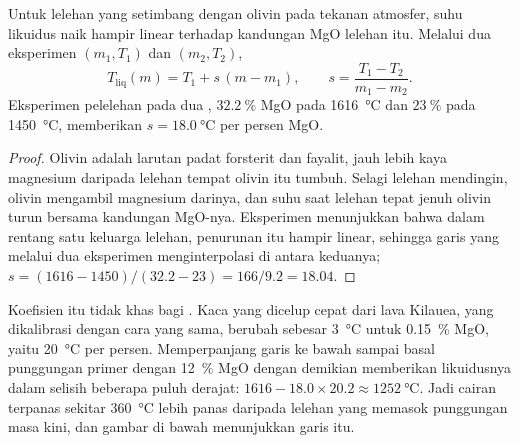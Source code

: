 \begin{proposition}\label{prop:b2:precambrian-earth:liquidus}
Untuk lelehan yang setimbang dengan olivin pada tekanan atmosfer, suhu likuidus naik
hampir linear terhadap kandungan MgO lelehan itu. Melalui dua eksperimen $(m_1, T_1)$ dan
$(m_2, T_2)$,
\[
  T_{\text{liq}}(m) = T_1 + s\,(m - m_1), \qquad s = \frac{T_1 - T_2}{m_1 - m_2} .
\]
Eksperimen pelelehan pada dua , $\qty{32.2}{\percent}$ MgO pada \qty{1616}{\celsius} dan
$\qty{23}{\percent}$ pada \qty{1450}{\celsius}, memberikan $s = \qty{18.0}{\celsius}$ per persen
MgO.
\end{proposition}

\begin{proof}
Olivin adalah larutan padat forsterit dan fayalit, jauh lebih kaya magnesium daripada lelehan
tempat olivin itu tumbuh. Selagi lelehan mendingin, olivin mengambil magnesium darinya, dan suhu
saat lelehan tepat jenuh olivin turun bersama kandungan MgO-nya. Eksperimen menunjukkan bahwa
dalam rentang satu keluarga lelehan, penurunan itu hampir linear, sehingga garis yang melalui
dua eksperimen menginterpolasi di antara keduanya; $s = (1616 - 1450)/(32.2 - 23) = 166/9.2 = 18.04$.
\end{proof}

Koefisien itu tidak khas bagi . Kaca yang dicelup cepat dari lava Kilauea,
yang dikalibrasi dengan cara yang sama, berubah sebesar \qty{3}{\celsius} untuk \qty{0.15}{\percent} MgO, yaitu
\qty{20}{\celsius} per persen. Memperpanjang garis  ke bawah sampai basal punggungan primer
dengan \qty{12}{\percent} MgO dengan demikian memberikan likuidusnya dalam selisih beberapa puluh derajat: $1616 -
18.0\times20.2 \approx \qty{1252}{\celsius}$. Jadi cairan  terpanas
sekitar \qty{360}{\celsius} lebih panas daripada lelehan yang memasok punggungan masa kini, dan gambar di bawah
menunjukkan garis itu.

